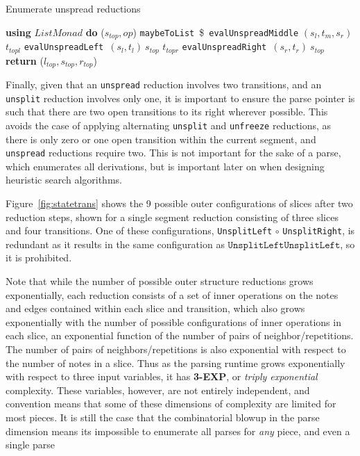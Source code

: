 \documentclass[12pt,a4paper,twoside,openright]{report}
\theoremstyle{definition}
\begin{document}
\begin{algorithm}[h]
  \caption{Enumerate unspread reductions}
  \label{code:heuristic0}
  \begin{algorithmic}[1]
    \State \textbf{using} $List Monad$ \textbf{do} 
    \State ($s_{top}, op$) \gets \texttt{maybeToList}~\$~\texttt{evalUnspreadMiddle} $(s_l, t_m, s_r)$ 
    \State $t_{topl}$ \gets \texttt{evalUnspreadLeft}~$(s_l, t_l)~s_{top}$
    \State $t_{topr}$ \gets \texttt{evalUnspreadRight}~$(s_r, t_r)~s_{top}$
    \State \textbf{return} ($l_{top}, s_{top}, r_{top}$)
    \EndFunction
  \end{algorithmic}
\end{algorithm}

Finally, given that an \texttt{unspread} reduction involves two transitions, and an \texttt{unsplit} reduction involves only one, it is important to ensure the parse pointer is such that there are two open transitions to its right wherever possible. This avoids the case of applying alternating \texttt{unsplit} and \texttt{unfreeze} reductions, as there is only zero or one open transition within the current segment, and \texttt{unspread} reductions require two. This is not important for the sake of a parse, which enumerates all derivations, but is important later on when designing heuristic search algorithms. \footnotemark 


Figure~\ref{fig:statetrans} shows the 9 possible outer configurations of slices after two reduction steps, shown for a single segment reduction consisting of three slices and four transitions. One of these configurations, \texttt{UnsplitLeft} $\circ$ \texttt{UnsplitRight}, is redundant as it results in the same configuration as $\texttt{UnsplitLeft} $$ \texttt{UnsplitLeft}$, so it is prohibited.

Note that while the number of possible outer structure reductions grows exponentially, each reduction consists of a set of inner operations on the notes and edges contained within each slice and transition, which also grows exponentially with the number of possible configurations of inner operations in each slice, an exponential function of the number of pairs of neighbor/repetitions. The number of pairs of neighbors/repetitions is also exponential with respect to the number of notes in a slice.
Thus as the parsing runtime grows exponentially with respect to three input variables, it has \textbf{3-EXP}, or \textit{triply exponential} complexity. These variables, however, are not entirely independent, and convention means that some of these dimensions of complexity are limited for most pieces. It is still the case that the combinatorial blowup in the parse dimension means its impossible to enumerate all parses for \textit{any} piece, and even a single parse 
\end{document}
